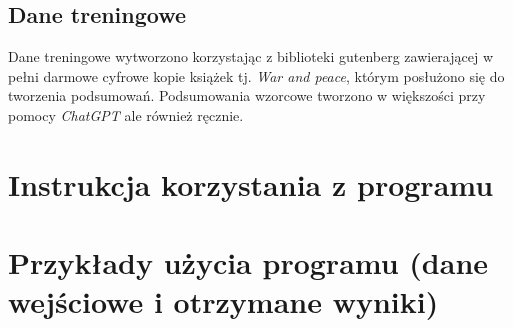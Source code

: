 \documentclass{article}
\begin{document}
\subsection{Dane treningowe}
Dane treningowe wytworzono korzystając z biblioteki gutenberg \cite{gutenberg}
zawierającej w pełni darmowe cyfrowe kopie książek tj. \textit{War and peace}, którym
posłużono się do tworzenia podsumowań. Podsumowania wzorcowe tworzono w większości przy pomocy
\textit{ChatGPT} ale również ręcznie.

\section{Instrukcja korzystania z programu}
\section{Przykłady użycia programu (dane wejściowe i otrzymane wyniki)}



\end{document}
